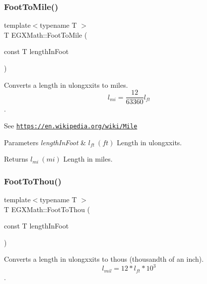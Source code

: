 \subsubsection{\texorpdfstring{Foot\+To\+Mile()}{FootToMile()}}
{\footnotesize\ttfamily template$<$typename T $>$ \\
T E\+G\+X\+Math\+::\+Foot\+To\+Mile (\begin{DoxyParamCaption}\item[{const T}]{length\+In\+Foot }\end{DoxyParamCaption})}



Converts a length in ulongxxits to miles. \[ l_{mi}=\frac{12}{63360} l_{ft} \]. 

See \href{https://en.wikipedia.org/wiki/Mile}{\tt https\+://en.\+wikipedia.\+org/wiki/\+Mile} 
\begin{DoxyParams}{Parameters}
{\em length\+In\+Foot} & $ l_{ft}\ (ft)$ Length in ulongxxits. \\
\hline
\end{DoxyParams}
\begin{DoxyReturn}{Returns}
$ l_{mi}\ (mi)$ Length in miles. 
\end{DoxyReturn}
\mbox{\label{group___e_g_x_math-_conversions-_length_conversions-_imperial-_foot-_imperial_gab8b02110f4657f92b7de8a42b9494017}} 
\subsubsection{\texorpdfstring{Foot\+To\+Thou()}{FootToThou()}}
{\footnotesize\ttfamily template$<$typename T $>$ \\
T E\+G\+X\+Math\+::\+Foot\+To\+Thou (\begin{DoxyParamCaption}\item[{const T}]{length\+In\+Foot }\end{DoxyParamCaption})}



Converts a length in ulongxxits to thous (thousandth of an inch). \[ l_{mil}=12 * l_{ft} * 10^{3} \]. 

